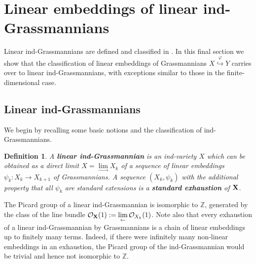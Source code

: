 \documentclass[12pt]{amsart}
\def\ZZ {{\mathbb Z}}     %
\def\hw  {\hookrightarrow}
\def\mc {\mathcal}
\newtheorem{definition}{Definition}[section]
\begin{document}
\section{Linear embeddings of linear ind-Grassmannians}\label{Sec Ind Embed}

Linear ind-Grassmannians are defined and classified in \cite{Penkov-Tikhomirov-Lin-ind-Grass}. In this final section we show that the classification of linear embeddings of Grassmannians $X\stackrel{\varphi}{\hw} Y$ carries over to linear ind-Grassmannians, with exceptions similar to those in the finite-dimensional case.


\subsection{Linear ind-Grassmannians}

We begin by recalling some basic notions and the classification of ind-Grassmannians.

\begin{definition}\label{Def standard Lin indGrass}
A {\bf linear ind-Grassmannian} is an ind-variety $X$ which can be obtained as a direct limit $X=\lim\limits_{\to} X_k$ of a sequence of linear embeddings $\psi_k:X_k\to X_{k+1}$ of Grassmannians. A sequence $(X_k,\psi_k)$ with the additional property that all $\psi_k$ are standard extensions is a {\bf standard exhaustion} of ${\bf X}$.
\end{definition}

The Picard group of a linear ind-Grassmannian is isomorphic to $\ZZ$, generated by the class of the line bundle $\mc O_{\bf X}(1):=\lim\limits_{\leftarrow} \mc O_{X_k}(1)$. Note also that every exhaustion of a linear ind-Grassmannian by Grassmannians is a chain of linear embeddings up to finitely many terms. Indeed, if there were infinitely many non-linear embeddings in an exhaustion, the Picard group of the ind-Grassmannian would be trivial and hence not isomorphic to $\ZZ$.
\end{document}
